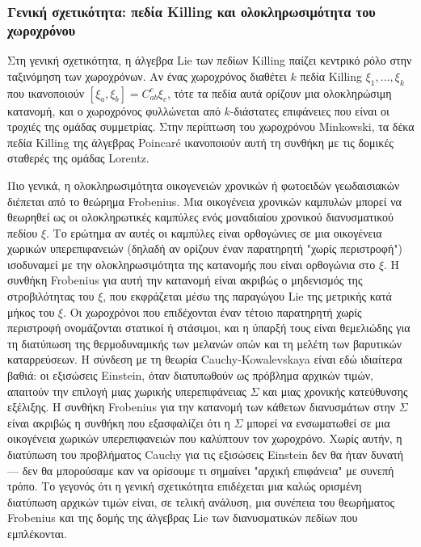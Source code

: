 \documentclass[12pt]{article}
\begin{document}
\subsubsection{Γενική σχετικότητα: πεδία Killing και ολοκληρωσιμότητα του χωροχρόνου}

Στη γενική σχετικότητα, η άλγεβρα Lie των πεδίων Killing παίζει κεντρικό ρόλο στην ταξινόμηση των χωροχρόνων. Αν ένας χωροχρόνος διαθέτει $k$ πεδία Killing $\xi_1, \dots, \xi_k$ που ικανοποιούν $[\xi_a, \xi_b] = C_{ab}^c \xi_c$, τότε τα πεδία αυτά ορίζουν μια ολοκληρώσιμη κατανομή, και ο χωροχρόνος φυλλώνεται από $k$-διάστατες επιφάνειες που είναι οι τροχιές της ομάδας συμμετρίας. Στην περίπτωση του χωροχρόνου Minkowski, τα δέκα πεδία Killing της άλγεβρας Poincaré ικανοποιούν αυτή τη συνθήκη με τις δομικές σταθερές της ομάδας Lorentz.

Πιο γενικά, η ολοκληρωσιμότητα οικογενειών χρονικών ή φωτοειδών γεωδαισιακών διέπεται από το θεώρημα Frobenius. Μια οικογένεια χρονικών καμπυλών μπορεί να θεωρηθεί ως οι ολοκληρωτικές καμπύλες ενός μοναδιαίου χρονικού διανυσματικού πεδίου $\xi$. Το ερώτημα αν αυτές οι καμπύλες είναι ορθογώνιες σε μια οικογένεια χωρικών υπερεπιφανειών (δηλαδή αν ορίζουν έναν παρατηρητή "χωρίς περιστροφή") ισοδυναμεί με την ολοκληρωσιμότητα της κατανομής που είναι ορθογώνια στο $\xi$. Η συνθήκη Frobenius για αυτή την κατανομή είναι ακριβώς ο μηδενισμός της στροβιλότητας του $\xi$, που εκφράζεται μέσω της παραγώγου Lie της μετρικής κατά μήκος του $\xi$. Οι χωροχρόνοι που επιδέχονται έναν τέτοιο παρατηρητή χωρίς περιστροφή ονομάζονται στατικοί ή στάσιμοι, και η ύπαρξή τους είναι θεμελιώδης για τη διατύπωση της θερμοδυναμικής των μελανών οπών και τη μελέτη των βαρυτικών καταρρεύσεων. Η σύνδεση με τη θεωρία Cauchy-Kowalevskaya είναι εδώ ιδιαίτερα βαθιά: οι εξισώσεις Einstein, όταν διατυπωθούν ως πρόβλημα αρχικών τιμών, απαιτούν την επιλογή μιας χωρικής υπερεπιφάνειας $\Sigma$ και μιας χρονικής κατεύθυνσης εξέλιξης. Η συνθήκη Frobenius για την κατανομή των κάθετων διανυσμάτων στην $\Sigma$ είναι ακριβώς η συνθήκη που εξασφαλίζει ότι η $\Sigma$ μπορεί να ενσωματωθεί σε μια οικογένεια χωρικών υπερεπιφανειών που καλύπτουν τον χωροχρόνο. Χωρίς αυτήν, η διατύπωση του προβλήματος Cauchy για τις εξισώσεις Einstein δεν θα ήταν δυνατή — δεν θα μπορούσαμε καν να ορίσουμε τι σημαίνει "αρχική επιφάνεια" με συνεπή τρόπο. Το γεγονός ότι η γενική σχετικότητα επιδέχεται μια καλώς ορισμένη διατύπωση αρχικών τιμών είναι, σε τελική ανάλυση, μια συνέπεια του θεωρήματος Frobenius και της δομής της άλγεβρας Lie των διανυσματικών πεδίων που εμπλέκονται.
\end{document}
